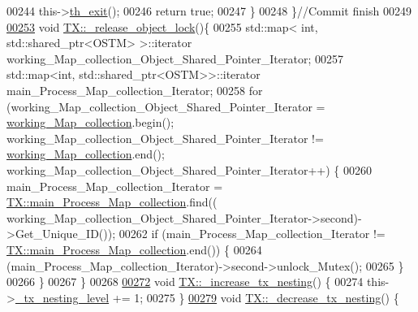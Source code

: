 \begin{DoxyCode}
00244         this->\hyperlink{class_t_x_ae045534c4a9d39bd5c6ea2a39a372a79_ae045534c4a9d39bd5c6ea2a39a372a79}{th\_exit}();
00246         \textcolor{keywordflow}{return} \textcolor{keyword}{true};
00247     \}
00248 \}\textcolor{comment}{//Commit finish}
00249 
\hypertarget{_t_x_8cpp_source.tex_l00253}{}\hyperlink{class_t_x_a4c13d2015dc15d0f788fa9a1413f0463_a4c13d2015dc15d0f788fa9a1413f0463}{00253} \textcolor{keywordtype}{void} \hyperlink{class_t_x_a4c13d2015dc15d0f788fa9a1413f0463_a4c13d2015dc15d0f788fa9a1413f0463}{TX::\_release\_object\_lock}()\{
00255     std::map< int, std::shared\_ptr<OSTM> >::iterator working\_Map\_collection\_Object\_Shared\_Pointer\_Iterator;
00257     std::map<int, std::shared\_ptr<OSTM>>::iterator main\_Process\_Map\_collection\_Iterator;
00258     \textcolor{keywordflow}{for} (working\_Map\_collection\_Object\_Shared\_Pointer\_Iterator = 
      \hyperlink{class_t_x_a81aafda16e2f20e36ec6c68e584668ff_a81aafda16e2f20e36ec6c68e584668ff}{working\_Map\_collection}.begin(); working\_Map\_collection\_Object\_Shared\_Pointer\_Iterator
       != \hyperlink{class_t_x_a81aafda16e2f20e36ec6c68e584668ff_a81aafda16e2f20e36ec6c68e584668ff}{working\_Map\_collection}.end(); 
      working\_Map\_collection\_Object\_Shared\_Pointer\_Iterator++) \{
00260             main\_Process\_Map\_collection\_Iterator = 
      \hyperlink{class_t_x_a1a45d726894190695314464d7cd97c29_a1a45d726894190695314464d7cd97c29}{TX::main\_Process\_Map\_collection}.find((
      working\_Map\_collection\_Object\_Shared\_Pointer\_Iterator->second)->Get\_Unique\_ID());
00262             \textcolor{keywordflow}{if} (main\_Process\_Map\_collection\_Iterator != 
      \hyperlink{class_t_x_a1a45d726894190695314464d7cd97c29_a1a45d726894190695314464d7cd97c29}{TX::main\_Process\_Map\_collection}.end()) \{
00264                 (main\_Process\_Map\_collection\_Iterator)->second->unlock\_Mutex();
00265             \} 
00266         \}
00267 \}
00268 
\hypertarget{_t_x_8cpp_source.tex_l00272}{}\hyperlink{class_t_x_a1384bdf12d795854b5d32e7f61ffbdb8_a1384bdf12d795854b5d32e7f61ffbdb8}{00272} \textcolor{keywordtype}{void} \hyperlink{class_t_x_a1384bdf12d795854b5d32e7f61ffbdb8_a1384bdf12d795854b5d32e7f61ffbdb8}{TX::\_increase\_tx\_nesting}() \{
00274     this->\hyperlink{class_t_x_ae8f413fd7f4fea322e7ad3c668f9898e_ae8f413fd7f4fea322e7ad3c668f9898e}{\_tx\_nesting\_level} += 1;
00275 \}
\hypertarget{_t_x_8cpp_source.tex_l00279}{}\hyperlink{class_t_x_aa3ac499f576326588628ade96b27b4b1_aa3ac499f576326588628ade96b27b4b1}{00279} \textcolor{keywordtype}{void} \hyperlink{class_t_x_aa3ac499f576326588628ade96b27b4b1_aa3ac499f576326588628ade96b27b4b1}{TX::\_decrease\_tx\_nesting}() \{

\end{DoxyCode}
